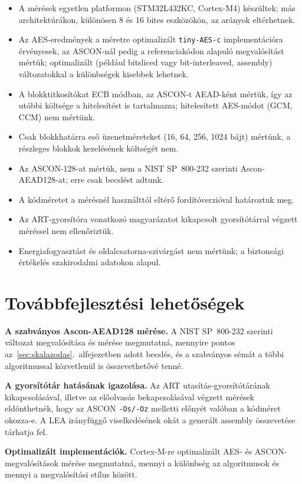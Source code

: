 \documentclass[a4paper,12pt]{report}
\theoremstyle{definition}
\theoremstyle{remark}
\begin{document}
\begin{itemize}
	\item A mérések egyetlen platformon (STM32L432KC, Cortex-M4) készültek; más architektúrákon, különösen 8 és 16 bites eszközökön, az arányok eltérhetnek.
	\item Az AES-eredmények a méretre optimalizált \texttt{tiny-AES-c} implementációra érvényesek, az ASCON-nál pedig a referenciakódon alapuló megvalósítást mértük; optimalizált (például bitsliced vagy bit-interleaved, assembly) változatokkal a különbségek kisebbek lehetnek.
	\item A blokktitkosítókat ECB módban, az ASCON-t AEAD-ként mértük, így az utóbbi költsége a hitelesítést is tartalmazza; hitelesített AES-módot (GCM, CCM) nem mértünk.
	\item Csak blokkhatárra eső üzenetméreteket (16, 64, 256, 1024 bájt) mértünk, a részleges blokkok kezelésének költségét nem.
	\item Az ASCON-128-at mértük, nem a NIST SP~800-232 szerinti Ascon-AEAD128-at; erre csak becslést adtunk.
	\item A kódméretet a mérésnél használttól eltérő fordítóverzióval határoztuk meg.
	\item Az ART-gyorsítóra vonatkozó magyarázatot kikapcsolt gyorsítótárral végzett méréssel nem ellenőriztük.
	\item Energiafogyasztást és oldalcsatorna-szivárgást nem mértünk; a biztonsági értékelés szakirodalmi adatokon alapul.
\end{itemize}

\section{Továbbfejlesztési lehetőségek}\label{sec:tovabbfejlesztes}

\textbf{A szabványos Ascon-AEAD128 mérése.} A NIST SP~800-232 szerinti változat megvalósítása és mérése megmutatná, mennyire pontos az~\ref{sec:skalazodas}.~alfejezetben adott becslés, és a szabványos sémát a többi algoritmussal közvetlenül is összevethetővé tenné.

\textbf{A gyorsítótár hatásának igazolása.} Az ART utasítás-gyorsítótárának kikapcsolásával, illetve az előolvasás bekapcsolásával végzett mérések eldönthetnék, hogy az ASCON \texttt{-Os/-Oz} melletti előnyét valóban a kódméret okozza-e. A LEA irányfüggő viselkedésének okát a generált assembly összevetése tárhatja fel.

\textbf{Optimalizált implementációk.} Cortex-M-re optimalizált AES- és ASCON-megvalósítások mérése megmutatná, mennyi a különbség az algoritmusok és mennyi a megvalósítási stílus között.
\end{document}
